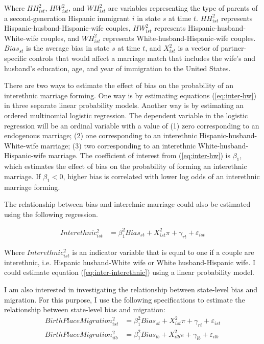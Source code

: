 \documentclass[12pt, fullpage]{article}
\begin{document}
Where $ HH_{ist}^2$, $ HW_{ist}^2$, and $ WH_{ist}^2$ are variables representing the type of parents of a second-generation Hispanic immigrant $i$ in state $s$ at time $t$. $HH_{ist}^2$ represents Hispanic-husband-Hispanic-wife couples, $HW_{ist}^2$ represents Hispanic-husband-White-wife couples, and $WH_{ist}^2$ represents White-husband-Hispanic-wife couples. $Bias_{st}$ is the average bias in state $s$ at time $t$, and $X_{ist}^2$ is a vector of partner-specific controls that would affect a marriage match that includes the wife's and husband's education, age, and year of immigration to the United States. 

There are two ways to estimate the effect of bias on the probability of an interethnic marriage forming. One way is by estimating equations (\ref{eq:inter-hw}) in three separate linear probability models. Another way is by estimating an ordered multinomial logistic regression. The dependent variable in the logistic regression will be an ordinal variable with a value of (1) zero corresponding to an endogenous marriage; (2) one corresponding to an interethnic Hispanic-husband-White-wife marriage; (3) two corresponding to an interethnic White-husband-Hispanic-wife marriage. The coefficient of interest from (\ref{eq:inter-hw}) is $\beta_1$, which estimates the effect of bias on the probability of forming an interethnic marriage. If $\beta_1 < 0$, higher bias is correlated with lower log odds of an interethnic marriage forming.

The relationship between bias and interehnic marriage could also be estimated using the following regression. 

\begin{align}
Interethnic_{ist}^2 &= \beta_1^2 Bias_{st} + X_{ist}^2\pi + \gamma_{rt} 
            + \varepsilon_{ist}  \label{eq:inter-interethnic} 
\end{align}

Where $Interethnic_{ist}^2$ is an indicator variable that is equal to one if a couple are interethnic, i.e. Hispanic husband-White wife or White husband-Hispanic wife. I could estimate equation (\ref{eq:inter-interethnic}) using a linear probability model. 

I am also interested in investigating the relationship between state-level bias and migration. For this purpose, I use the following specifications to estimate the relationship between state-level bias and migration:
\begin{align}
BirthPlaceMigration_{ist}^2 &= \beta_1^2 Bias_{st} 
                   + X_{ist}^2\pi + \gamma_{rt} 
                   + \varepsilon_{ist} \label{eq:migration-3} \\
BirthPlaceMigration_{ilb}^2 &= \beta_1^2 Bias_{lb} 
                   + X_{ilb}^2\pi + \gamma_{lb} 
                   + \varepsilon_{ilb} \label{eq:migration-4}
\end{align}
\end{document}
